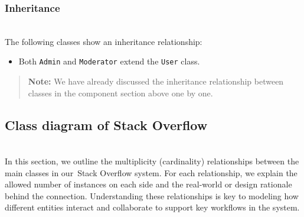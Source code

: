 \subsubsection{Inheritance}\label{spPUwOm3kRzPiqkKehu98-6}
\\
The following classes show an inheritance relationship:

\begin{itemize}
\item
\protect{}\label{_GJKGdL2E93QuWD8Lqe65}
Both \texttt{Admin} and \texttt{Moderator} extend the \texttt{User} class.
\end{itemize}
\begin{quote}
\textbf{Note:} We have already discussed the inheritance relationship between classes in the component section above one by one.
\end{quote}
\subsection{Class diagram of Stack Overflow}\label{3sEclHHEhig4Zl_D5AnZy}
\\
In this section, we outline the multiplicity (cardinality) relationships between the main classes in our~Stack Overflow system. For each relationship, we explain the allowed number of instances on each side and the real-world or design rationale behind the connection. Understanding these relationships is key to modeling how different entities interact and collaborate to support key workflows in the system.

